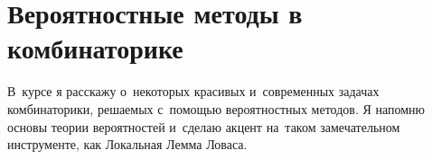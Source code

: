 
\section*{Вероятностные методы в комбинаторике}



В~курсе я расскажу о~некоторых красивых и~современных задачах комбинаторики,
решаемых с~помощью вероятностных методов.
Я напомню основы теории вероятностей и~сделаю акцент на~таком замечательном
инструменте, как Локальная Лемма Ловаса.

